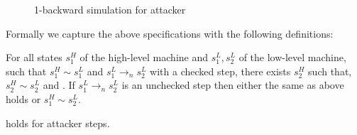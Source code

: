\begin{minipage}{\linewidth}
\begin{minipage}{0.45\linewidth}
\begin{figure}[H]
\begin{center}
      \end{center}
      \caption{1-backward simulation for attacker}
    \end{figure}
    \bigskip
  \end{minipage}
\end{minipage}

Formally we capture the above specifications with the following definitions:

\begin{definition}
\label{backward_simulation_preservation}
  For all states $s^H_1$ of the high-level machine and $s^L_1, s^L_2$ of
  the low-level machine, such that $s^H_1 \sim s^L_1$ and $s^L_1 \to_n s^L_2$
  with a checked step, there exists $s^H_2$ such that,
  $s^H_2 \sim s^L_2$ and .
  If $s^L_1 \to_n s^L_2$ is an unchecked step then either the same as above
  holds or $s^H_1 \sim s^L_2$.
\end{definition}

\begin{definition}
\label{backward_simulation_a_preservation}
   holds for attacker steps.
\end{definition}






